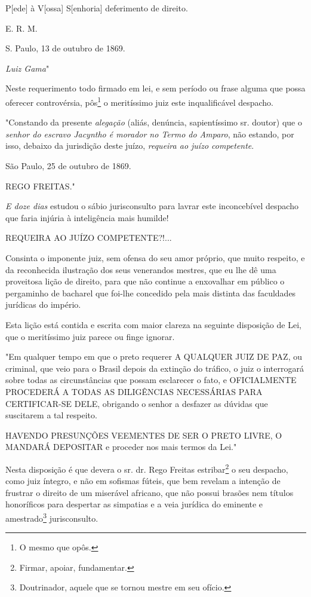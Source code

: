 P{[}ede{]} à V{[}ossa{]} S{[}enhoria{]} deferimento de direito.

E. R. M.

S. Paulo, 13 de outubro de 1869.

\emph{Luiz Gama}"

Neste requerimento todo firmado em lei, e sem período ou frase alguma
que possa oferecer controvérsia, pôs\footnote{O mesmo que opôs.} o
meritíssimo juiz este inqualificável despacho.

"Constando da presente \emph{alegação} (aliás, denúncia, sapientíssimo
sr. doutor) que o \emph{senhor do escravo Jacyntho é morador no Termo do
Amparo}, não estando, por isso, debaixo da jurisdição deste juízo,
\emph{requeira ao juízo competente}.

São Paulo, 25 de outubro de 1869.

REGO FREITAS."

\emph{E doze dias} estudou o sábio jurisconsulto para lavrar este
inconcebível despacho que faria injúria à inteligência mais humilde!

REQUEIRA AO JUÍZO COMPETENTE?!...

Consinta o imponente juiz, sem ofensa do seu amor próprio, que muito
respeito, e da reconhecida ilustração dos seus venerandos mestres, que
eu lhe dê uma proveitosa lição de direito, para que não continue a
enxovalhar em público o pergaminho de bacharel que foi-lhe concedido
pela mais distinta das faculdades jurídicas do império.

Esta lição está contida e escrita com maior clareza na seguinte
disposição de Lei, que o meritíssimo juiz parece ou finge ignorar.

"Em qualquer tempo em que o preto requerer A QUALQUER JUIZ DE PAZ, ou
criminal, que veio para o Brasil depois da extinção do tráfico, o juiz o
interrogará sobre todas as circunstâncias que possam esclarecer o fato,
e OFICIALMENTE PROCEDERÁ A TODAS AS DILIGÊNCIAS NECESSÁRIAS PARA
CERTIFICAR-SE DELE, obrigando o senhor a desfazer as dúvidas que
suscitarem a tal respeito.

HAVENDO PRESUNÇÕES VEEMENTES DE SER O PRETO LIVRE, O MANDARÁ DEPOSITAR e
proceder nos mais termos da Lei."

Nesta disposição é que devera o sr. dr. Rego Freitas estribar\footnote{
  Firmar, apoiar, fundamentar.} o seu despacho, como juiz íntegro, e não
em sofismas fúteis, que bem revelam a intenção de frustrar o direito de
um miserável africano, que não possui brasões nem títulos honoríficos
para despertar as simpatias e a veia jurídica do eminente e
amestrado\footnote{Doutrinador, aquele que se tornou mestre em seu
  ofício.} jurisconsulto.

